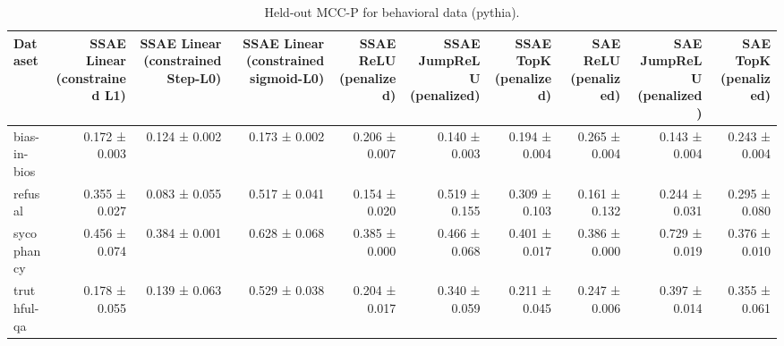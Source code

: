 \begin{table}[t]
\centering
\caption{Held-out MCC-P for behavioral data (pythia).}
\label{tab:behavioral-pythia-mcc-p}
\begin{tabular}{lrrrrrrrrr}
\toprule
Dataset & SSAE Linear (constrained L1) & SSAE Linear (constrained Step-L0) & SSAE Linear (constrained sigmoid-L0) & SSAE ReLU (penalized) & SSAE JumpReLU (penalized) & SSAE TopK (penalized) & SAE ReLU (penalized) & SAE JumpReLU (penalized) & SAE TopK (penalized) \\
\midrule
bias-in-bios & 0.172 ± 0.003 & 0.124 ± 0.002 & 0.173 ± 0.002 & 0.206 ± 0.007 & 0.140 ± 0.003 & 0.194 ± 0.004 & 0.265 ± 0.004 & 0.143 ± 0.004 & 0.243 ± 0.004 \\
refusal & 0.355 ± 0.027 & 0.083 ± 0.055 & 0.517 ± 0.041 & 0.154 ± 0.020 & 0.519 ± 0.155 & 0.309 ± 0.103 & 0.161 ± 0.132 & 0.244 ± 0.031 & 0.295 ± 0.080 \\
sycophancy & 0.456 ± 0.074 & 0.384 ± 0.001 & 0.628 ± 0.068 & 0.385 ± 0.000 & 0.466 ± 0.068 & 0.401 ± 0.017 & 0.386 ± 0.000 & 0.729 ± 0.019 & 0.376 ± 0.010 \\
truthful-qa & 0.178 ± 0.055 & 0.139 ± 0.063 & 0.529 ± 0.038 & 0.204 ± 0.017 & 0.340 ± 0.059 & 0.211 ± 0.045 & 0.247 ± 0.006 & 0.397 ± 0.014 & 0.355 ± 0.061 \\
\bottomrule
\end{tabular}
\end{table}
